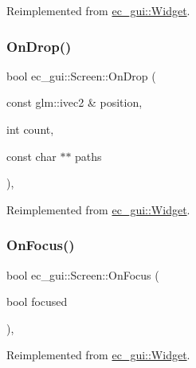 Reimplemented from \mbox{\hyperlink{classec__gui_1_1_widget_a4cef77dd2f523b09bb771e245c285ca8}{ec\+\_\+gui\+::\+Widget}}.

\mbox{\label{classec__gui_1_1_screen_adb7eb3a5c83749054a6b275cd05ddee7}} 
\subsubsection{\texorpdfstring{On\+Drop()}{OnDrop()}}
{\footnotesize\ttfamily bool ec\+\_\+gui\+::\+Screen\+::\+On\+Drop (\begin{DoxyParamCaption}\item[{const glm\+::ivec2 \&}]{position,  }\item[{int}]{count,  }\item[{const char $\ast$$\ast$}]{paths }\end{DoxyParamCaption})\hspace{0.3cm}{\ttfamily [override]}, {\ttfamily [virtual]}}



Reimplemented from \mbox{\hyperlink{classec__gui_1_1_widget_a2b053e3f775081317f2bae8600efcdea}{ec\+\_\+gui\+::\+Widget}}.

\mbox{\label{classec__gui_1_1_screen_a3a0f971501303d0285c0f38c2b424237}} 
\subsubsection{\texorpdfstring{On\+Focus()}{OnFocus()}}
{\footnotesize\ttfamily bool ec\+\_\+gui\+::\+Screen\+::\+On\+Focus (\begin{DoxyParamCaption}\item[{bool}]{focused }\end{DoxyParamCaption})\hspace{0.3cm}{\ttfamily [override]}, {\ttfamily [virtual]}}



Reimplemented from \mbox{\hyperlink{classec__gui_1_1_widget_ad8c4e0841214f66501a0cefc4f6e863e}{ec\+\_\+gui\+::\+Widget}}.

\mbox{\label{classec__gui_1_1_screen_a17f251d79b8e3d07658c37768f1572d3}} 
